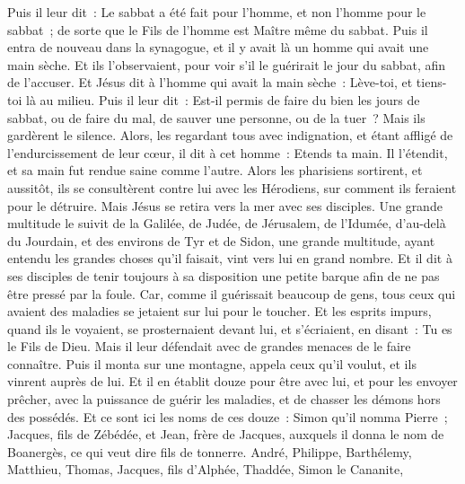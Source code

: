 \begin{multicols}{2}
Puis il leur dit~: Le sabbat a été fait pour l'homme, et non l'homme pour le sabbat~;
de sorte que le Fils de l'homme est Maître même du sabbat.
\VerseOne{}Puis il entra de nouveau dans la synagogue, et il y avait là un homme qui avait une main sèche.
Et ils l'observaient, pour voir s'il le guérirait le jour du sabbat, afin de l'accuser.
Et Jésus dit à l'homme qui avait la main sèche~: Lève-toi, et tiens-toi là au milieu.
Puis il leur dit~: Est-il permis de faire du bien les jours de sabbat, ou de faire du mal, de sauver une personne, ou de la tuer~? Mais ils gardèrent le silence.
Alors, les regardant tous avec indignation, et étant affligé de l'endurcissement de leur cœur, il dit à cet homme~: Etends ta main. Il l'étendit, et sa main fut rendue saine comme l'autre.
Alors les pharisiens sortirent, et aussitôt, ils se consultèrent contre lui avec les Hérodiens, sur comment ils feraient pour le détruire.
Mais Jésus se retira vers la mer avec ses disciples. Une grande multitude le suivit de la Galilée,
de Judée, de Jérusalem, de l'Idumée, d'au-delà du Jourdain, et des environs de Tyr et de Sidon, une grande multitude, ayant entendu les grandes choses qu'il faisait, vint vers lui en grand nombre.
Et il dit à ses disciples de tenir toujours à sa disposition une petite barque afin de ne pas être pressé par la foule.
Car, comme il guérissait beaucoup de gens, tous ceux qui avaient des maladies se jetaient sur lui pour le toucher.
Et les esprits impurs, quand ils le voyaient, se prosternaient devant lui, et s'écriaient, en disant~: Tu es le Fils de Dieu.
Mais il leur défendait avec de grandes menaces de le faire connaître.
Puis il monta sur une montagne, appela ceux qu'il voulut, et ils vinrent auprès de lui.
Et il en établit douze pour être avec lui,
et pour les envoyer prêcher, avec la puissance de guérir les maladies, et de chasser les démons hors des possédés.
Et ce sont ici les noms de ces douze~: Simon qu'il nomma Pierre~;
Jacques, fils de Zébédée, et Jean, frère de Jacques, auxquels il donna le nom de Boanergès, ce qui veut dire fils de tonnerre.
André, Philippe, Barthélemy, Matthieu, Thomas, Jacques, fils d'Alphée, Thaddée, Simon le Cananite,

\end{multicols}
